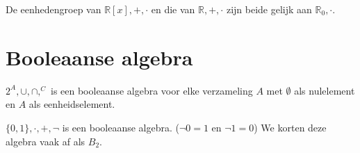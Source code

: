 \documentclass[main.tex]{subfiles}
\begin{document}
\begin{vb}
  De eenhedengroep van $\mathbb{R}[x],+,\cdot$ en die van $\mathbb{R},+,\cdot$ zijn beide gelijk aan  $\mathbb{R}_{0},\cdot$.
\end{vb}

 


\section{Booleaanse algebra}
\label{sec:booleaanse-algebra}

\begin{vb}
  $2^{A},\cup,\cap,^{C}$ is een booleaanse algebra voor elke verzameling $A$ met $\emptyset$ als nulelement en $A$ als eenheidselement.
\end{vb}

\begin{vb}
  $\{0,1\},\cdot,+,\neg$ is een booleaanse algebra. ($\neg 0 = 1$ en $\neg 1 = 0$)
  We korten deze algebra vaak af als $B_{2}$.
\end{vb}
\end{document}
